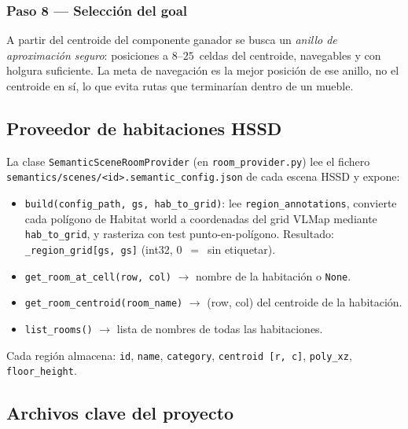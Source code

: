 \documentclass[11pt,a4paper]{article}
\begin{document}
\subsubsection*{Paso 8 --- Selección del goal}

A partir del centroide del componente ganador se busca un \emph{anillo de
aproximación seguro}: posiciones a $8$--$25$~celdas del centroide,
navegables y con holgura suficiente. La meta de navegación es la mejor
posición de ese anillo, no el centroide en sí, lo que evita rutas que
terminarían dentro de un mueble.

\subsection{Proveedor de habitaciones HSSD}

La clase \texttt{SemanticSceneRoomProvider} (en \texttt{room\_provider.py})
lee el fichero \texttt{semantics/scenes/<id>.semantic\_config.json} de cada
escena HSSD y expone:

\begin{itemize}
  \item \texttt{build(config\_path, gs, hab\_to\_grid)}: lee
        \texttt{region\_annotations}, convierte cada polígono de Habitat
        world a coordenadas del grid VLMap mediante \texttt{hab\_to\_grid},
        y rasteriza con test punto-en-polígono. Resultado:
        \texttt{\_region\_grid[gs, gs]} (int32, 0~$=$~sin etiquetar).
  \item \texttt{get\_room\_at\_cell(row, col)} $\rightarrow$ nombre de la
        habitación o \texttt{None}.
  \item \texttt{get\_room\_centroid(room\_name)} $\rightarrow$ (row, col) del
        centroide de la habitación.
  \item \texttt{list\_rooms()} $\rightarrow$ lista de nombres de todas las
        habitaciones.
\end{itemize}

Cada región almacena: \texttt{id}, \texttt{name}, \texttt{category},
\texttt{centroid [r, c]}, \texttt{poly\_xz}, \texttt{floor\_height}.

\subsection{Archivos clave del proyecto}
\end{document}
